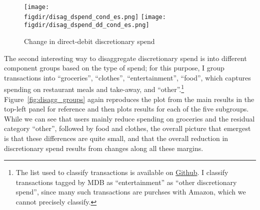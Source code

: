 \begin{figure}[h]
    \centering
    \caption{Change in direct-debit discretionary spend}%
    \label{fig:disagg_dd}
    \texttt{[image: \\figdir/disag\_dspend\_cond\_es.png]}
    \texttt{[image: \\figdir/disag\_dspend\_dd\_cond\_es.png]}
\end{figure}

The second interesting way to disaggregate discretionary spend is into
different component groups based on the type of spend; for this purpose, I
group transactions into ``groceries'', ``clothes'', ``entertainment'',
``food'', which captures spending on restaurant meals and take-away, and
``other''.\footnote{The list used to classify transactions is available on
    \href{https://github.com/fabiangunzinger/mdb_eval/blob/f31bfcd7a330188cdd27968d41957ebf5b454099/src/data/aggregators.py\#L389}{Github}.
    I classify transactions tagged by MDB as ``entertainment'' as ``other
discretionary spend'', since many such transactions are purchses with Amazon,
which we cannot precisely classify.} Figure~\ref{fig:disagg_groups} again
reproduces the plot from the main results in the top-left panel for reference
and then plots results for each of the five subgroups. While we can see that users
mainly reduce spending on groceries and the residual category ``other'',
followed by food and clothes, the overall picture that emergest is that these
differences are quite small, and that the overall reduction in discretionary
spend results from changes along all these margins.

